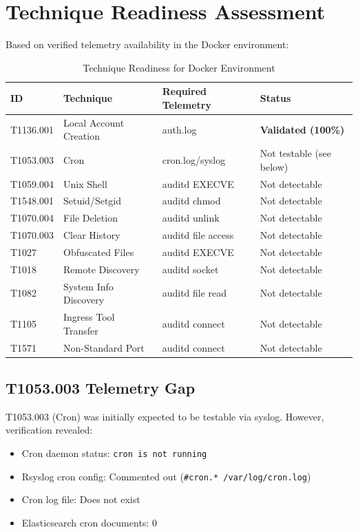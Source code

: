 \documentclass[11pt,a4paper]{article}
\begin{document}
\section{Technique Readiness Assessment}
\label{sec:readiness}

Based on verified telemetry availability in the Docker environment:

\begin{table}[H]
    \centering
    \caption{Technique Readiness for Docker Environment}
    \label{tab:readiness}
    \begin{tabular}{llll}
        \toprule
        \textbf{ID} & \textbf{Technique} & \textbf{Required Telemetry} & \textbf{Status} \\
        \midrule
        T1136.001 & Local Account Creation & auth.log & \textbf{Validated (100\%)} \\
        \midrule
        T1053.003 & Cron & cron.log/syslog & Not testable (see below) \\
        T1059.004 & Unix Shell & auditd EXECVE & Not detectable \\
        T1548.001 & Setuid/Setgid & auditd chmod & Not detectable \\
        T1070.004 & File Deletion & auditd unlink & Not detectable \\
        T1070.003 & Clear History & auditd file access & Not detectable \\
        T1027 & Obfuscated Files & auditd EXECVE & Not detectable \\
        T1018 & Remote Discovery & auditd socket & Not detectable \\
        T1082 & System Info Discovery & auditd file read & Not detectable \\
        T1105 & Ingress Tool Transfer & auditd connect & Not detectable \\
        T1571 & Non-Standard Port & auditd connect & Not detectable \\
        \bottomrule
    \end{tabular}
\end{table}

\subsection{T1053.003 Telemetry Gap}

T1053.003 (Cron) was initially expected to be testable via syslog. However, verification revealed:

\begin{itemize}
    \item Cron daemon status: \texttt{cron is not running}
    \item Rsyslog cron config: Commented out (\texttt{\#cron.* /var/log/cron.log})
    \item Cron log file: Does not exist
    \item Elasticsearch cron documents: 0
\end{itemize}
\end{document}
